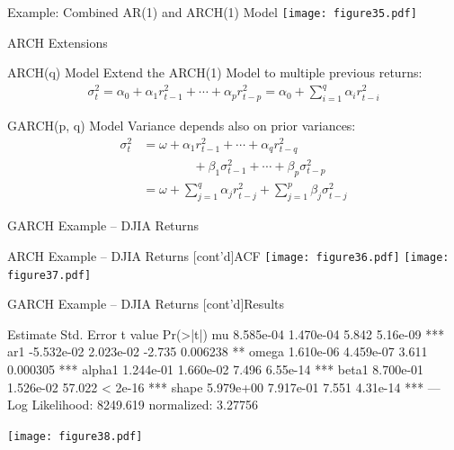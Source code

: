 \documentclass[ignorenonframetext,xcolor=x11names]{beamer}
\begin{document}
\begin{frame}{Example: Combined AR(1) and ARCH(1) Model}
\centering
\texttt{[image: figure35.pdf]}
\end{frame}

\begin{frame}{ARCH Extensions}
\begin{block}{ARCH(q) Model}
Extend the ARCH(1) Model to multiple previous returns:
\begin{align*}
\sigma_t^2 = \alpha_0 + \alpha_1 r_{t-1}^2 + \cdots + \alpha_p r_{t-p}^2 = \alpha_0 + \sum_{i=1}^q \alpha_i r_{t-i}^2
\end{align*}
\end{block}

\begin{block}{GARCH(p, q) Model}
Variance depends also on prior variances:
\begin{align*}
\sigma_t^2 &= \omega + \alpha_1 r_{t-1}^2 + \cdots + \alpha_q r_{t-q}^2 \\
           & \qquad \qquad + \beta_1 \sigma_{t-1}^2 + \cdots + \beta_p \sigma_{t-p}^2 \\
           &= \omega + \sum_{j=1}^q \alpha_j r_{t-j}^2 + \sum_{j=1}^p \beta_j \sigma_{t-j}^2
\end{align*}
\end{block}
\end{frame}

\begin{frame}[fragile]{GARCH Example -- DJIA Returns}
\end{frame}

\begin{frame}{ARCH Example -- DJIA Returns \small [cont'd]}{ACF}
\centering
\texttt{[image: figure36.pdf]}
\texttt{[image: figure37.pdf]}
\end{frame}

\begin{frame}[fragile]{GARCH Example -- DJIA Returns \small [cont'd]}{Results}
\begin{textcode}
         Estimate  Std. Error  t value Pr(>|t|)    
mu      8.585e-04   1.470e-04    5.842 5.16e-09 ***
ar1    -5.532e-02   2.023e-02   -2.735 0.006238 ** 
omega   1.610e-06   4.459e-07    3.611 0.000305 ***
alpha1  1.244e-01   1.660e-02    7.496 6.55e-14 ***
beta1   8.700e-01   1.526e-02   57.022  < 2e-16 ***
shape   5.979e+00   7.917e-01    7.551 4.31e-14 ***
---
Log Likelihood:
 8249.619    normalized:  3.27756 
\end{textcode}

\vspace{-\baselineskip}
\begin{center}
\texttt{[image: figure38.pdf]}
\end{center}
\end{frame}
\end{document}
